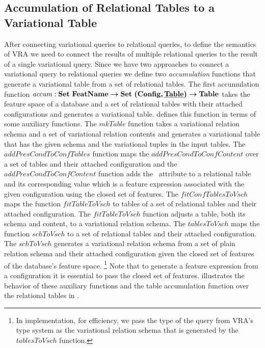 \subsection{Accumulation of Relational Tables to a Variational Table}
\label{sec:accum}

After connecting variational queries to relational queries, to define the 
semantics of VRA we need to connect
the results of multiple relational queries to the result of a single variational 
query. 
%
Since we have two approaches to connect a variational query to relational queries 
we define two \emph{accumulation} functions that generate a 
variational table from a set of relational tables. 
%
The first accumulation function $\mathit{accum} : \settype \fSet \totype \settype {\typepair \confSet \pTabSet} \totype \tabletype$ takes the feature space of a database and a set of relational
tables with their attached configurations and generates a variational table.  
defines this function in terms of some auxiliary functions. 
%
The $\mathit{mkTable}$ function takes a variational relation schema and a set of 
variational relation contents and generates a variational table that has the given schema
and the variational tuples in the input tables. 
%
The $\mathit{addPresCondToConfTables}$ function maps the $\mathit{addPresCondToConfContent}$
over a set of tables and their attached configuration and the  $\mathit{addPresCondToConfContent}$
function adds the \pcatt\ attribute to a relational table and its corresponding value which is 
a feature expression associated with the given configuration using the closed set of
features.
%
The $\mathit{fitConfTablesToVsch}$ maps the function $\mathit{fitTableToVsch}$ to tables of a set of 
relational tables and their attached configuration.
The $\mathit{fitTableToVsch}$ function adjusts a table, both its schema and content, 
to a variational relation schema.
%
The $\mathit{tablesToVsch}$ maps the function $\mathit{schToVsch}$ to a set of 
relational tables and their attached configuration. 
The $\mathit{schToVsch}$ generates a variational relation schema from a set of
plain relation schema and their attached configuration given the closed set of 
features of the database's feature space.%
\footnote{In implementation, for efficiency, we pass the type of the query from VRA's type system
as the variational relation schema that is generated by the $\mathit{tablesToVsch}$ function.}
%
Note that to generate a feature expression from a configuration it is essential to
pass the closed set of features.
%
 illustrates the behavior of these auxiliary functions and the
table accumulation function over the relational tables in .


